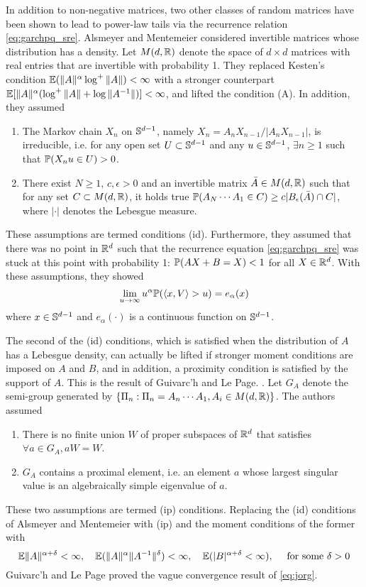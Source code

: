 In addition to non-negative matrices, two other classes of random
matrices have been shown to lead to power-law tails via the recurrence
relation \eqref{eq:garchpq_sre}. Alsmeyer and Mentemeier
\cite{alsmeyer:mentemeier:2012} considered invertible matrices whose
distribution has a density. Let $M(d, \reals)$ denote the space of
$d \times d$ matrices with real entries that are invertible with
probability 1. They replaced Kesten's condition
$\E (\|A\|^\alpha \log^+\|A\|) < \infty$ with a stronger
counterpart
$\E [\|A\|^\alpha (\log^+\|A\| + \log \|A^{-1} \|)] < \infty$,
and lifted the condition (A). In addition, they assumed
\begin{enumerate}
  \item The Markov chain $X_n$ on $\sphere^{d-1}$, namely
    $X_n = A_n X_{n-1} / |A_n X_{n-1}|$, is irreducible, i.e. for any open
    set $U \subset \sphere^{d-1}$ and any $u \in \sphere^{d-1}$, 
    $\exists n \geq 1$ such that $\P(X_n u \in U) > 0$.
  \item There exist $N \geq 1$, $c, \epsilon > 0$ and an invertible
    matrix $\bar A \in M(d, \reals)$ such that for any set
    $C \subset M(d, \reals)$, it holds true
    $\P(A_N \cdots A_1 \in C) \geq c |B_\epsilon(\bar A) \cap C|$,
    where $|\cdot|$ denotes the Lebesgue measure.
\end{enumerate}
These assumptions are termed conditions (id). Furthermore, they assumed
that there was no point in $\reals^d$ such that the recurrence
equation \eqref{eq:garchpq_sre} was stuck at this point with probability 1: 
$\P(A X + B = X) < 1$ for all $X \in \reals^d$. With these
assumptions, they showed
\[
\lim_{u \to \infty} u^\alpha \P(\inn{x, V} > u) = e_\alpha(x)
\]
where $x \in \sphere^{d - 1}$ and $e_\alpha(\cdot)$ is a continuous
function on $\sphere^{d-1}$.

The second of the (id) conditions, which is satisfied when the
distribution of $A$ has a Lebesgue density, can actually be lifted if
stronger moment conditions are imposed on $A$ and $B$, and in
addition, a proximity condition is satisfied by the support of
$A$. This is the result of Guivarc'h and Le Page.
\cite{guivarc:page:2016}. Let $G_A$ denote the semi-group generated
by $\{\Pi_n: \Pi_n = A_n \cdots A_1, A_i \in M(d, \reals)\}$. The
authors assumed
\begin{enumerate}
  \item There is no finite union $W$ of proper subspaces of $\reals^d$
    that satisfies $\forall a \in G_A, a W = W$.
  \item $G_A$ contains a proximal element, i.e. an element $a$ whose
    largest singular value is an algebraically simple eigenvalue of $a$.
\end{enumerate}
These two assumptions are termed (ip) conditions. Replacing the (id)
conditions of Alsmeyer and Mentemeier with (ip) and the moment
conditions of the former with
\[
\E \|A\|^{\alpha + \delta} < \infty, \quad
\E (\|A\|^{\alpha} \|A^{-1}\|^{\delta}) < \infty, \quad
\E (|B|^{\alpha + \delta} < \infty),\quad
\text{ for some }\delta > 0
\]
Guivarc'h and Le Page proved the vague convergence result of \eqref{eq:jorg}.

